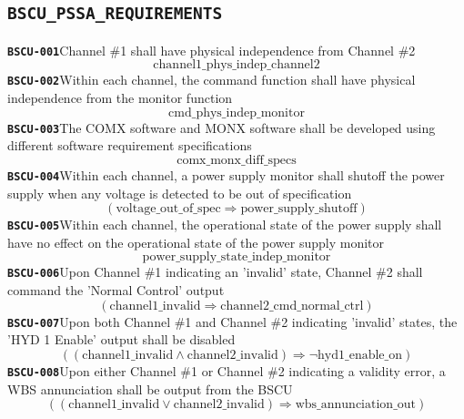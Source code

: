 \documentclass[11pt,a4paper]{article}
\begin{document}
\subsection*{\texttt{BSCU\_PSSA\_REQUIREMENTS}}
\noindent\textbf{\texttt{BSCU-001}}\quad Channel \#1 shall have physical independence from Channel \#2
\begin{dmath*}
\text{channel1\_phys\_indep\_channel2}
\end{dmath*}
\noindent\textbf{\texttt{BSCU-002}}\quad Within each channel, the command function shall have physical independence from the monitor function
\begin{dmath*}
\text{cmd\_phys\_indep\_monitor}
\end{dmath*}
\noindent\textbf{\texttt{BSCU-003}}\quad The COMX software and MONX software shall be developed using different software requirement specifications
\begin{dmath*}
\text{comx\_monx\_diff\_specs}
\end{dmath*}
\noindent\textbf{\texttt{BSCU-004}}\quad Within each channel, a power supply monitor shall shutoff the power supply when any voltage is detected to be out of specification
\begin{dmath*}
(\text{voltage\_out\_of\_spec} \Rightarrow \text{power\_supply\_shutoff})
\end{dmath*}
\noindent\textbf{\texttt{BSCU-005}}\quad Within each channel, the operational state of the power supply shall have no effect on the operational state of the power supply monitor
\begin{dmath*}
\text{power\_supply\_state\_indep\_monitor}
\end{dmath*}
\noindent\textbf{\texttt{BSCU-006}}\quad Upon Channel \#1 indicating an 'invalid' state, Channel \#2 shall command the 'Normal Control' output
\begin{dmath*}
(\text{channel1\_invalid} \Rightarrow \text{channel2\_cmd\_normal\_ctrl})
\end{dmath*}
\noindent\textbf{\texttt{BSCU-007}}\quad Upon both Channel \#1 and Channel \#2 indicating 'invalid' states, the 'HYD 1 Enable' output shall be disabled
\begin{dmath*}
((\text{channel1\_invalid} \wedge \text{channel2\_invalid}) \Rightarrow \neg \text{hyd1\_enable\_on})
\end{dmath*}
\noindent\textbf{\texttt{BSCU-008}}\quad Upon either Channel \#1 or Channel \#2 indicating a validity error, a WBS annunciation shall be output from the BSCU
\begin{dmath*}
((\text{channel1\_invalid} \vee \text{channel2\_invalid}) \Rightarrow \text{wbs\_annunciation\_out})
\end{dmath*}
\end{document}
